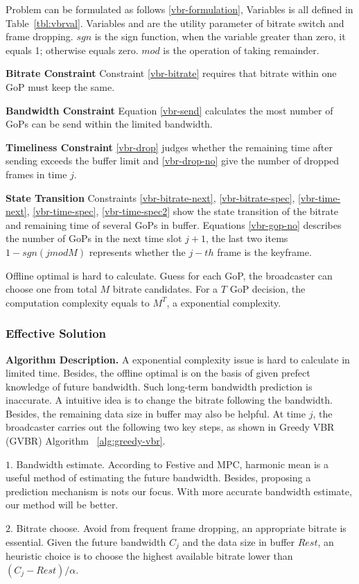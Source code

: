 Problem can be formulated as follows \ref{vbr-formulation}, Variables is all defined in Table~\ref{tbl:vbrval}. Variables and are the utility parameter of bitrate switch and frame dropping. $sgn$ is the sign function, when the variable greater than zero, it equals 1; otherwise equals zero. $mod$ is the operation of taking remainder.

\textbf{Bitrate Constraint} Constraint \ref{vbr-bitrate} requires that bitrate within one GoP must keep the same.

\textbf{Bandwidth Constraint} Equation \ref{vbr-send} calculates the most number of GoPs can be send within the limited bandwidth.

\textbf{Timeliness Constraint} \ref{vbr-drop} judges whether the remaining time after sending exceeds the buffer limit and \ref{vbr-drop-no} give the number of dropped frames in time $j$.

\textbf{State Transition} Constraints \ref{vbr-bitrate-next}, \ref{vbr-bitrate-spec}, \ref{vbr-time-next}, \ref{vbr-time-spec}, \ref{vbr-time-spec2} show the state transition of the bitrate and remaining time of several GoPs in buffer. Equations \ref{vbr-gop-no} describes the number of GoPs in the next time slot $j+1$, the last two items $1-sgn(j{mod}M)$ represents whether the $j-th$ frame is the keyframe.

Offline optimal is hard to calculate. Guess for each GoP, the broadcaster can choose one from total $M$ bitrate candidates. For a $T$ GoP decision, the computation complexity equals to $M^T$, a exponential complexity.

\subsubsection{Effective Solution}

\textbf{Algorithm Description.} A exponential complexity issue is hard to calculate in limited time. Besides, the offline optimal is on the basis of given prefect knowledge of future bandwidth. Such long-term bandwidth prediction is inaccurate. A intuitive idea is to change the bitrate following the bandwidth. Besides, the remaining data size in buffer may also be helpful. At time $j$, the broadcaster carries out the following two key steps, as shown in Greedy VBR (GVBR) Algorithm ~\ref{alg:greedy-vbr}.

$1.$ Bandwidth estimate. According to Festive and MPC, harmonic mean is a useful method of estimating the future bandwidth. Besides, proposing a prediction mechanism is nots our focus. With more accurate bandwidth estimate, our method will be better.

$2.$ Bitrate choose. Avoid from frequent frame dropping, an appropriate bitrate is essential. Given the future bandwidth $C_j$ and the data size in buffer $Rest$, an heuristic choice is to choose the highest available bitrate lower than $(C_j-Rest)/\alpha$.
